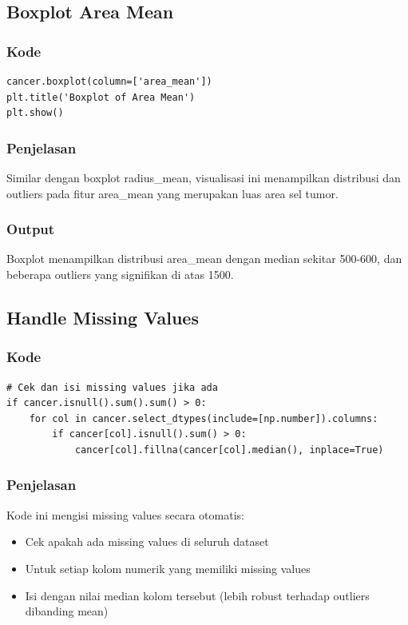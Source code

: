 \documentclass[12pt,a4paper]{article}
\begin{document}
\subsection{Boxplot Area Mean}

\subsubsection{Kode}
\begin{lstlisting}[style=pythonstyle]
cancer.boxplot(column=['area_mean'])
plt.title('Boxplot of Area Mean')
plt.show()
\end{lstlisting}

\subsubsection{Penjelasan}
Similar dengan boxplot radius\_mean, visualisasi ini menampilkan distribusi dan outliers pada fitur area\_mean yang merupakan luas area sel tumor.

\subsubsection{Output}
Boxplot menampilkan distribusi area\_mean dengan median sekitar 500-600, dan beberapa outliers yang signifikan di atas 1500.

\subsection{Handle Missing Values}

\subsubsection{Kode}
\begin{lstlisting}[style=pythonstyle]
# Cek dan isi missing values jika ada
if cancer.isnull().sum().sum() > 0:
    for col in cancer.select_dtypes(include=[np.number]).columns:
        if cancer[col].isnull().sum() > 0:
            cancer[col].fillna(cancer[col].median(), inplace=True)
\end{lstlisting}

\subsubsection{Penjelasan}
Kode ini mengisi missing values secara otomatis:
\begin{itemize}
    \item Cek apakah ada missing values di seluruh dataset
    \item Untuk setiap kolom numerik yang memiliki missing values
    \item Isi dengan nilai median kolom tersebut (lebih robust terhadap outliers dibanding mean)
\end{itemize}
\end{document}
